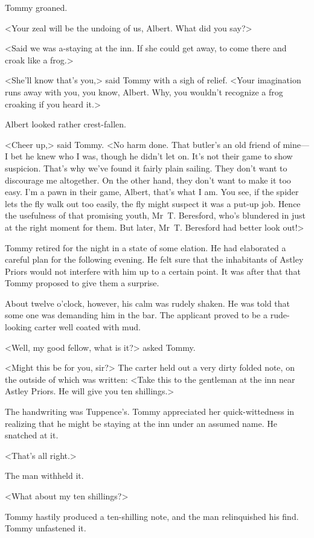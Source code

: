 Tommy groaned.

<Your zeal will be the undoing of us, Albert. What did you say?>

<Said we was a-staying at the inn. If she could get away, to come there and croak like a frog.>

<She'll know that's you,> said Tommy with a sigh of relief. <Your imagination runs away with you, you know, Albert. Why, you wouldn't recognize a frog croaking if you heard it.>

Albert looked rather crest-fallen.

<Cheer up,> said Tommy. <No harm done. That butler's an old friend of mine—I bet he knew who I was, though he didn't let on. It's not their game to show suspicion. That's why we've found it fairly plain sailing. They don't want to discourage me altogether. On the other hand, they don't want to make it too easy. I'm a pawn in their game, Albert, that's what I am. You see, if the spider lets the fly walk out too easily, the fly might suspect it was a put-up job. Hence the usefulness of that promising youth, Mr~T. Beresford, who's blundered in just at the right moment for them. But later, Mr~T. Beresford had better look out!>

Tommy retired for the night in a state of some elation. He had elaborated a careful plan for the following evening. He felt sure that the inhabitants of Astley Priors would not interfere with him up to a certain point. It was after that that Tommy proposed to give them a surprise.

About twelve o'clock, however, his calm was rudely shaken. He was told that some one was demanding him in the bar. The applicant proved to be a rude-looking carter well coated with mud.

<Well, my good fellow, what is it?> asked Tommy.

<Might this be for you, sir?> The carter held out a very dirty folded note, on the outside of which was written: <Take this to the gentleman at the inn near Astley Priors. He will give you ten shillings.>

The handwriting was Tuppence's. Tommy appreciated her quick-wittedness in realizing that he might be staying at the inn under an assumed name. He snatched at it.

<That's all right.>

The man withheld it.

<What about my ten shillings?>

Tommy hastily produced a ten-shilling note, and the man relinquished his find. Tommy unfastened it.

